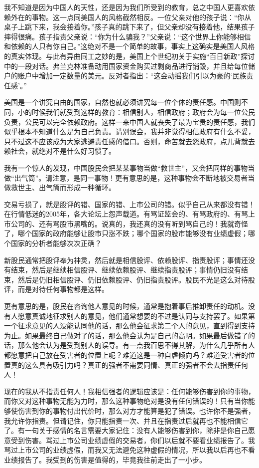 我不知道是因为中国人的天性，还是因为我们所受到的教育，总之中国人更喜欢依赖外在的事物。这一点同美国人的风格截然相反。一位父亲对他的孩子说：“你从桌子上跳下来，我会接着你。”孩子真的跳下来了，但父亲却没有接着他，结果孩子摔得很痛。孩子指责父亲说：“你为什么骗我？”父亲说：“这个世界上你能够相信和依赖的人只有你自己。”这绝对不是一个简单的故事，事实上这确实是美国人风格的真实体现。与此有异曲同工之妙的是，美国上个世纪初关于实施“百日新政”探讨中的一段对话。弗兰克林准备动用国家资金购买过剩商品进行销毁，并且给每位储户的账户中增加一定数量的美元。反对者指出：“这会动摇我们引以为豪的‘民族责任感’。”

美国是一个讲究自由的国家，自然也就必须讲究每一位个体的责任感。中国则不同，小的时候我们就受到这样的教育：相信别人，相信政府；政府会为每一位公民负责，公民可以完全依赖政府。这样一来中国人就丧失了最为宝贵的责任感，我们似乎根本不知道什么是为自己负责。请别误会，我并非觉得相信政府有什么不妥，只不过这不应该成为大家逃避责任感的借口。否则，命苦就去怨政府，点儿背就去赖社会，就绝对不是什么好习惯了。

我有一个惊人的发现，中国股民会把某某事物当做“救世主”，又会把同样的事物当做“出气筒”。请注意，是同一事物！更有意思的是，这种事物会不断地被交易者当做救世主、出气筒而形成一种循环。

交易亏损了，就是股评的错、国家的错、上市公司的错。似乎自己从来都没有错！在行情低迷的2005年，各大论坛上怨声载道。有骂证监会的、有骂政府的、有骂上市公司的、还有骂股市黑嘴的。说真的，我还真的没有听到骂自己的！我就奇怪了，哪个国家的政府能够让股市只涨不跌；哪个国家的股市能够没有业绩虚假；哪个国家的分析者能够次次正确？

新股民通常把股评奉为神灵，然后就是相信股评、依赖股评、指责股评；事情还没有结束，然后是继续相信股评、继续依赖股评、继续指责股评；事情仍旧没有结束，然后是仍旧相信股评、仍旧依赖股评、仍旧指责股评。股民不光是这么对待股评，而是对待任何事物都是这样。

更有意思的是，股民在咨询他人意见的时候，通常是抱着事后推卸责任的动机。没有人愿意真诚地征求别人的意见，他们通常想要的不过是认同与支持罢了。如果第一个征求意见的人没能认同他的话，那么他会征求第二个人的意见，直到得到支持为止。如果最终自己做对了的话，那么他会认为是自己的高明。如果最后做错了的话，那么他会认为是受到别人的误导。有一点我百思不得其解，为什么几乎所有人都愿意把自己放在受害者的位置上呢？难道这是一种自虐倾向吗？难道受害者的位置真的这么具有吸引力吗？真正的强者不需要同情、真正的强者不会去指责任何人！

现在的我从不指责任何人！我相信强者的逻辑应该是：任何能够伤害到你的事物，而你又对这种事物无能为力时，那么这种事物绝对是没有任何错误的！只有当你能够使伤害到你的事物付出代价时，那么对方才能算是犯了错误。也许你不是强者，我允许你指责。但请记住，你只能指责一次、并且在指责过后就再也不能相信它了。有一句关于感情的名言需要大家记住：没有人能够伤害到你，除非是你自己愿意受到伤害。骂过上市公司业绩虚假的交易者，你们以后就不要看业绩报告了。我骂过上市公司的业绩虚假，而我又无法避免这种虚假的情况，所以我以后再也不看业绩报告了。我受到的伤害是值得的，毕竟我往前走出了一小步。

